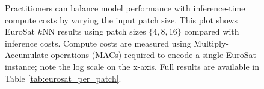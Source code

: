 \begin{figure}[ht]
    \vspace{-10pt}
    \caption{Practitioners can balance model performance with inference-time compute costs by varying the input patch size. This plot shows EuroSat $k$NN results using patch sizes $\{4, 8, 16\}$ compared with inference costs. Compute costs are measured using Multiply-Accumulate operations (MACs) required to encode a single EuroSat instance; note the log scale on the x-axis. Full results are available in Table \ref{tab:eurosat_per_patch}.}
    \label{fig:model_performance}
\end{figure}
